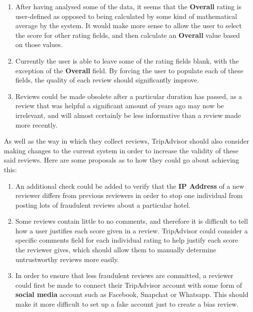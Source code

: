 \documentclass{article}
\begin{document}
	\begin{enumerate}
		\item After having analysed some of the data, it seems that the \textbf{Overall} rating is user-defined as opposed to being calculated by some kind of mathematical average by the system. It would make more sense to allow the user to select the score for other rating fields, and then calculate an \textbf{Overall} value based on those values.
		\item Currently the user is able to leave some of the rating fields blank, with the exception of the \textbf{Overall} field. By forcing the user to populate each of these fields, the quality of each review should significantly improve.
		\item Reviews could be made obsolete after a particular duration has passed, as a review that was helpful a significant amount of years ago may now be irrelevant, and will almost certainly be less informative than a review made more recently.
	\end{enumerate}

	As well as the way in which they collect reviews, TripAdvisor should also consider making changes to the current system in order to increase the validity of these said reviews. Here are some proposals as to how they could go about achieving this:
	
	\begin{enumerate}
		\item An additional check could be added to verify that the \textbf{IP Address} of a new reviewer differs from previous reviewers in order to stop one individual from posting lots of fraudulent reviews about a particular hotel.
		\item Some reviews contain little to no comments, and therefore it is difficult to tell how a user justifies each score given in a review. TripAdvisor could consider a specific comments field for each individual rating to help justify each score the reviewer gives, which should allow them to manually determine untrustworthy reviews more easily.
		\item In order to ensure that less fraudulent reviews are committed, a reviewer could first be made to connect their TripAdvisor account with some form of \textbf{social media} account such as Facebook, Snapchat or Whatsapp. This should make it more difficult to set up a fake account just to create a bias review.
	\end{enumerate}
	
\end{document}
